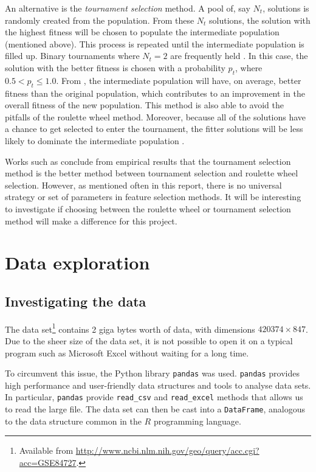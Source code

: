 \documentclass[12pt, twoside, a4paper]{report}
\begin{document}
An alternative is the \textit{tournament selection} method. A pool of, say $N_t$, solutions is randomly created from the population. From these $N_t$ solutions, the solution with the highest fitness will be chosen to populate the intermediate population (mentioned above). This process is repeated until the intermediate population is filled up.  Binary tournaments where $N_t=2$ are frequently held \cite{RefWorks:242, RefWorks:243}. In this case, the solution with the better fitness is chosen with a probability $p_t$, where $0.5 < p_t \leq 1.0$. From \cite{RefWorks:242}, the intermediate population will have, on average, better fitness than the original population, which contributes to an improvement in the overall fitness of the new population. This method is also able to avoid the pitfalls of the roulette wheel method. Moreover, because all of the solutions have a chance to get selected to enter the tournament, the fitter solutions will be less likely to dominate the intermediate population \cite{RefWorks:245}.

Works such as \cite{RefWorks:245, RefWorks:246} conclude from empirical results that the tournament selection method is the better method between tournament selection and roulette wheel selection. However, as mentioned often in this report, there is no universal strategy or set of parameters in feature selection methods. It will be interesting to investigate if choosing between the roulette wheel or tournament selection method will make a difference for this project.


\chapter{Data exploration}
\section{Investigating the data} \label{data:understanding}

The data set\footnote{Available from \url{http://www.ncbi.nlm.nih.gov/geo/query/acc.cgi?acc=GSE84727}.} contains 2 giga bytes worth of data, with dimensions $420374 \times 847$. Due to the sheer size of the data set, it is not possible to open it on a typical program such as Microsoft Excel without waiting for a long time.

To circumvent this issue, the Python library \texttt{pandas} \cite{RefWorks:213} was used. \texttt{pandas} provides high performance and user-friendly data structures and tools to analyse data sets. In particular, \texttt{pandas} provide \texttt{read\_csv} and \texttt{read\_excel} methods that allows us to read the large file. The data set can then be cast into a \texttt{DataFrame}, analogous to the data structure common in the $R$ programming language.
\end{document}
